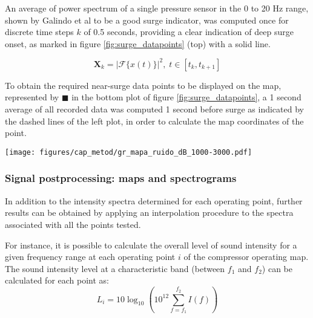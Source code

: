 An average of power spectrum of a single pressure sensor in the 0 to 20 Hz range, shown by Galindo et al \cite{galindo2006surge} to be a good surge indicator, was computed once for discrete time steps $k$ of 0.5 seconds, providing a clear indication of deep surge onset, as marked in figure \ref{fig:surge_datapoints} (top) with a solid line.

\begin{equation}
 \mathbf X_k=\left|\mathcal F\{x(t)\}\right|^2,\; t\in[t_k,t_{k+1}]
\end{equation}

To obtain the required near-surge data points to be displayed on the map, represented by $\blacksquare$ in the bottom plot of figure \ref{fig:surge_datapoints}, a 1 second average of all recorded data was computed 1 second before surge as indicated by the dashed lines of the left plot, in order to calculate the map coordinates of the point.

\begin{figure*}[tp!]
\centering
\texttt{[image: figures/cap\_metod/gr\_mapa\_ruido\_dB\_1000-3000.pdf]}
\caption[Sample of noise level map in the 1 -- 3 kHz band]{Sample of noise level in the 1 -- 3 kHz band obtained through the processing described in subsection \ref{sub:noise_maps_and_spectrograms}, including the measured data points $(\circ)$ and the paths later expanded as spectrograms shown in figure \ref{fig:spec50-5k}. The left hand side map represents the inlet duct, whereas the right hand side map represents the outlet duct. }
\label{fig:map1k-3k}
\end{figure*}

\subsubsection{Signal postprocessing: maps and spectrograms}
\label{sub:noise_maps_and_spectrograms}

In addition to the intensity spectra determined for each operating point, further results can be obtained by applying an interpolation procedure to the spectra associated with all the points tested.

For instance, it is possible to calculate the overall level of sound intensity for a given frequency range at each operating point $i$ of the compressor operating map. The sound intensity level at a characteristic band (between $f_1$ and $f_2$) can be calculated for each point as:
\begin{equation}\label{eq:point_level}
  L_i=10\log_{10}\left(10^{12}\sum_{f=f_1}^{f_2}I(f)\right)
\end{equation}

